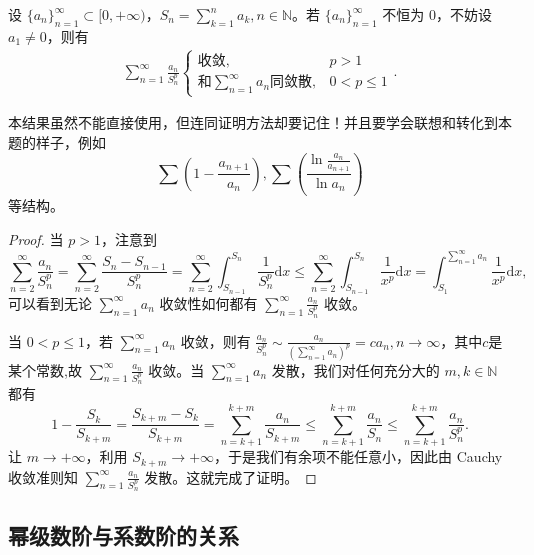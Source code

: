 \documentclass[../../main.tex]{subfiles}
\begin{document}
\begin{proposition}
设 \( \{a_n\}_{n = 1}^{\infty} \subset [0, +\infty) \)，\( S_n = \sum_{k = 1}^{n} a_k, n \in \mathbb{N} \)。若 \( \{a_n\}_{n = 1}^{\infty} \) 不恒为 0，不妨设 \( a_1 \neq 0 \)，则有
\begin{align*}
\sum_{n = 1}^{\infty} \frac{a_n}{S_n^p}
\begin{cases} 
\text{收敛}, & p > 1 \\
\text{和} \sum_{n = 1}^{\infty} a_n \text{同敛散}, & 0 < p \leqslant 1 
\end{cases}. 
\end{align*}
\end{proposition}
\begin{note}
本结果虽然不能直接使用，但连同证明方法却要记住！并且要学会联想和转化到本题的样子，例如
\[
\sum \left( 1 - \frac{a_{n + 1}}{a_n} \right), \sum \left( \frac{\ln \frac{a_n}{a_{n + 1}}}{\ln a_n} \right)
\]
等结构。
\end{note}
\begin{proof}
当 \( p > 1 \)，注意到
\[
\sum_{n = 2}^{\infty} \frac{a_n}{S_n^p} = \sum_{n = 2}^{\infty} \frac{S_n - S_{n - 1}}{S_n^p} = \sum_{n = 2}^{\infty} \int_{S_{n - 1}}^{S_n} \frac{1}{S_n^p} \mathrm{d}x \leqslant \sum_{n = 2}^{\infty} \int_{S_{n - 1}}^{S_n} \frac{1}{x^p} \mathrm{d}x = \int_{S_1}^{\sum\limits_{n = 1}^{\infty} a_n} \frac{1}{x^p} \mathrm{d}x,
\]
可以看到无论 \( \sum_{n = 1}^{\infty} a_n \) 收敛性如何都有 \( \sum_{n = 1}^{\infty} \frac{a_n}{S_n^p} \) 收敛。

当 \( 0 < p \leqslant 1 \)，若 \( \sum_{n = 1}^{\infty} a_n \) 收敛，则有 \( \frac{a_n}{S_n^p} \sim \frac{a_n}{\left( \sum\limits_{n = 1}^{\infty} a_n \right)^p}=ca_n, n \to \infty \)，其中$c$是某个常数,故 \( \sum_{n = 1}^{\infty} \frac{a_n}{S_n^p} \) 收敛。当 \( \sum_{n = 1}^{\infty} a_n \) 发散，我们对任何充分大的 \( m, k \in \mathbb{N} \) 都有
\[
1 - \frac{S_k}{S_{k + m}} = \frac{S_{k + m} - S_k}{S_{k + m}} = \sum_{n = k + 1}^{k + m} \frac{a_n}{S_{k + m}} \leqslant \sum_{n = k + 1}^{k + m} \frac{a_n}{S_n} \leqslant \sum_{n = k + 1}^{k + m} \frac{a_n}{S_n^p}.
\]
让 \( m \to +\infty \)，利用 \( S_{k + m} \to +\infty \)，于是我们有余项不能任意小，因此由 Cauchy 收敛准则知 \( \sum_{n = 1}^{\infty} \frac{a_n}{S_n^p} \) 发散。这就完成了证明。
\end{proof}

\subsection{幂级数阶与系数阶的关系}
\end{document}
